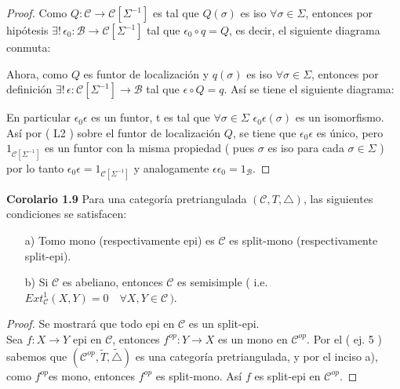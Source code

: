 \documentclass{article}
\begin{document}
\begin{enumerate}
\begin{proof}
Como $Q:\mathscr{C}\to\mathscr{C}[\Sigma^{-1}]$ es tal que $Q(\sigma)$ es iso $\forall \sigma \in \Sigma$, entonces por 
hipótesis $\exists !\,\epsilon_0:\mathscr{B}\to \mathscr{C}[\Sigma^{-1}]$ tal que $\epsilon_0\circ q=Q$, es decir, el siguiente diagrama conmuta:\\
\centerline{
}
Ahora, como $Q$ es funtor de localización y $q(\sigma)$ es iso $\forall \sigma\in \Sigma$, entonces por definición 
$\exists !\,\epsilon:\mathscr{C}[\Sigma^{-1}]\to \mathscr{B}$ tal que $\epsilon\circ Q=q$. Así se tiene el siguiente diagrama:\\
\centerline{
}

En particular $\epsilon_0\epsilon$ es un funtor, t es tal que $\forall \sigma\in \Sigma$ $\epsilon_0\epsilon(\sigma)$ es un isomorfismo. Así por ( L2 )
sobre el funtor de localización $Q$, se tiene que $\epsilon_0\epsilon$ es único, pero $1_{\mathscr{C}[\Sigma^{-1}]}$ es un funtor con la misma
propiedad ( pues $\sigma$ es iso para cada $\sigma \in \Sigma$  ) por lo tanto $\epsilon_0\epsilon=1_{\mathscr{C}[\Sigma^{-1}]}$ y analogamente
$\epsilon\epsilon_0=1_{\mathscr{B}}$.
\end{proof}

\textbf{Corolario 1.9} Para una categoría pretriangulada $(\mathscr{C},T,\triangle)$, las siguientes condiciones se satisfacen:
\begin{itemize}
\item[a)] Tomo mono (respectivamente epi) es $\mathscr{C}$ es split-mono (respectivamente split-epi).
\item[b)] Si $\mathscr{C}$ es abeliano, entonces $\mathscr{C}$ es semisimple ( i.e. \\ $Ext^{1}_\mathscr{C}(X,Y)=0\quad \forall X,Y\in \mathscr{C}\,)$.
\end{itemize}
\begin{proof}
Se mostrará que todo epi en $\mathscr{C}$ es un split-epi.\\

Sea $f:X\to Y$ epi en $\mathscr{C}$, entonces $f^{op}:Y\to X$ es un mono en $\mathscr{C}^{op}$. Por el ( ej. 5 ) sabemos que 
$(\mathscr{C}^{op},\tilde{T},\tilde{\triangle})$ es una categoría pretriangulada, y por el inciso a), como $f^{op}$es mono, entonces $f^{op}$ es 
split-mono. Así $f$ es split-epi en $\mathscr{C}^{op}$.
\end{proof}


\end{enumerate}
\end{document}
